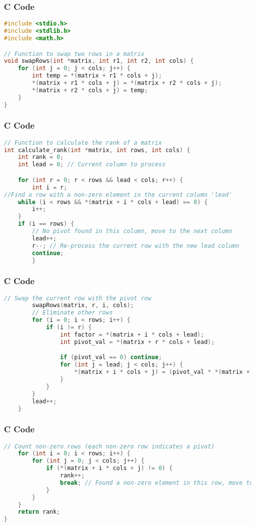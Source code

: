 \documentclass{beamer}
\begin{document}
\begin{frame}[fragile]
\frametitle{C Code}
\begin{lstlisting}[language=C]
#include <stdio.h>
#include <stdlib.h>
#include <math.h>

// Function to swap two rows in a matrix
void swapRows(int *matrix, int r1, int r2, int cols) {
    for (int j = 0; j < cols; j++) {
        int temp = *(matrix + r1 * cols + j);
        *(matrix + r1 * cols + j) = *(matrix + r2 * cols + j);
        *(matrix + r2 * cols + j) = temp;
    }
}
\end{lstlisting}
\end{frame}

\begin{frame}[fragile]
\frametitle{C Code}
\begin{lstlisting}[language=C]
// Function to calculate the rank of a matrix
int calculate_rank(int *matrix, int rows, int cols) {
    int rank = 0;
    int lead = 0; // Current column to process

    for (int r = 0; r < rows && lead < cols; r++) {
        int i = r;
//Find a row with a non-zero element in the current column 'lead'
    while (i < rows && *(matrix + i * cols + lead) == 0) {
        i++;
    }
    if (i == rows) {
        // No pivot found in this column, move to the next column
        lead++;
        r--; // Re-process the current row with the new lead column
        continue;
        }
\end{lstlisting}
\end{frame}

\begin{frame}[fragile]
\frametitle{C Code}
\begin{lstlisting}[language=C]
        // Swap the current row with the pivot row
        swapRows(matrix, r, i, cols);
        // Eliminate other rows
        for (i = 0; i < rows; i++) {
            if (i != r) {
                int factor = *(matrix + i * cols + lead);
                int pivot_val = *(matrix + r * cols + lead);

                if (pivot_val == 0) continue;
                for (int j = lead; j < cols; j++) {
                    *(matrix + i * cols + j) = (pivot_val * *(matrix + i * cols + j)) - (factor * *(matrix + r * cols + j));
                }
            }
        }
        lead++;
    }
\end{lstlisting}
\end{frame}

\begin{frame}[fragile]
\frametitle{C Code}
\begin{lstlisting}[language=C]
    // Count non-zero rows (each non-zero row indicates a pivot)
    for (int i = 0; i < rows; i++) {
        for (int j = 0; j < cols; j++) {
            if (*(matrix + i * cols + j) != 0) {
                rank++;
                break; // Found a non-zero element in this row, move to the next row
            }
        }
    }
    return rank;
}
\end{lstlisting}
\end{frame}
\end{document}
